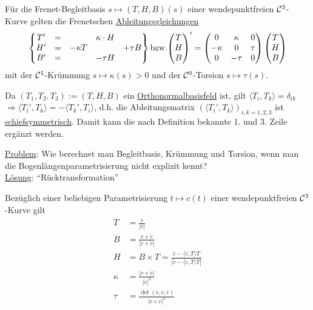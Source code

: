 \begin{satz}\label{satz134}
 Für die Frenet-Begleitbasis \(s \mapsto (T,H,B)(s)\) einer wendepunktfreien \(\mathcal{C}^3\)-Kurve gelten die Frenetschen \uline{Ableitungsgleichungen}
 \[\begin{Bmatrix}
  T' &= &&\kappa \cdot H \\
  H' &= &-\kappa T &&+ \tau B \\
  B' &= &&-\tau H
 \end{Bmatrix} \text{bzw.}
 {\ensuremath{\begin{pmatrix} T \\ H \\ B \end{pmatrix} }}' = \begin{pmatrix}
                      0 & \kappa & 0 \\
                      -\kappa & 0 & \tau \\
                      0 & -\tau & 0
                     \end{pmatrix} \begin{pmatrix} T \\ H \\ B \end{pmatrix} 
 \]
mit der \(\mathcal{C}^1\)-Krümmung \(s \mapsto \kappa(s) > 0\) und der \(\mathcal{C}^0\)-Torsion \(s \mapsto \tau(s) \).
\end{satz}

\begin{beweis} 
Da \((T_1, T_2, T_3) := (T,H,B)\) ein \uline{Orthonormalbasisfeld} ist, gilt \(\langle T_i, T_k \rangle = \delta_{ik}\) \\
 \(\Rightarrow \langle T_i', T_k \rangle = -\langle T_k', T_i \rangle\), d.h. die Ableitungsmatrix \((\langle T_i', T_k \rangle)_{i,k=1,2,3}\) ist \uline{schiefsymmetrisch}. Damit kann die nach Definition bekannte 1. und 3. Zeile ergänzt werden.
\end{beweis}

\uline{Problem}: Wie berechnet man Begleitbasis, Krümmung und Torsion, wenn man die Bogenlängen\-parametrisierung nicht explizit kennt? \\
\uline{Lösung}: "`Rücktransformation"'

\begin{folgerung}
 Bezüglich einer beliebigen Parametrisierung \(t \mapsto c(t)\) einer wendepunktfreien \(\mathcal{C}^3\)-Kurve gilt
 \begin{align*}
  T &= \frac{\dot c}{|\dot c|} \\
  B &= \frac{\dot c \times \ddot c}{|\dot c \times \ddot c|} \\
  H &= B \times T = \frac{\ddot c - \langle \ddot c, T \rangle T}{|\ddot c - \langle \ddot c, T \rangle T|} \\
  \kappa &= \frac{|\dot c \times \ddot c|}{|\dot c|^3} \\
  \tau &= \frac{\det (\dot c, \ddot c, \dddot c)}{|\dot c \times \ddot c|^2}
 \end{align*}

\end{folgerung}

